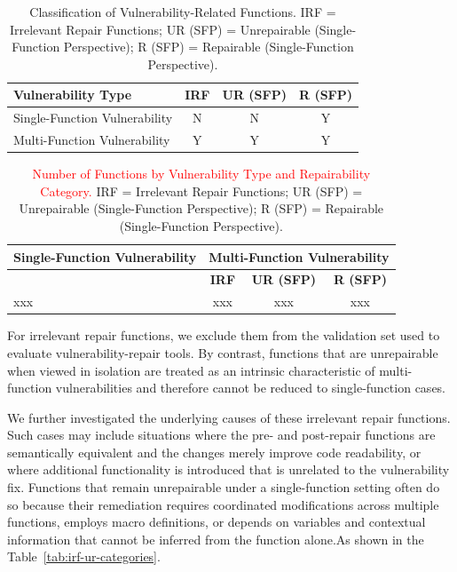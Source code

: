 \begin{table}[h]
\centering
\begin{tabular}{l|c|c|c}
\hline
\textbf{Vulnerability Type} & \textbf{IRF} & \textbf{UR (SFP)} & \textbf{R (SFP)} \\
\hline
Single-Function Vulnerability & N & N & Y \\
Multi-Function Vulnerability  & Y & Y & Y \\
\hline
\end{tabular}
\caption{Classification of Vulnerability-Related Functions. 
IRF = Irrelevant Repair Functions; UR (SFP) = Unrepairable (Single-Function Perspective); R (SFP) = Repairable (Single-Function Perspective).}
\label{tab:func-classification}
\end{table}


\begin{table}[h]
\centering
\begin{tabular}{>{\centering\arraybackslash}p{3cm}|c|c|c}
\hline
\textbf{Single-Function Vulnerability} & \multicolumn{3}{c}{\textbf{Multi-Function Vulnerability}} \\
\cline{2-4}
 & \textbf{IRF} & \textbf{UR (SFP)} & \textbf{R (SFP)} \\
\hline
xxx & xxx & xxx & xxx \\
\hline
\end{tabular}
\caption{\textcolor{red}{Number of Functions by Vulnerability Type and Repairability Category. }
IRF = Irrelevant Repair Functions; UR (SFP) = Unrepairable (Single-Function Perspective); R (SFP) = Repairable (Single-Function Perspective).}
\label{tab:func-classification-number}
\end{table}


For irrelevant repair functions, we exclude them from the validation set used to evaluate vulnerability-repair tools. By contrast, functions that are unrepairable when viewed in isolation are treated as an intrinsic characteristic of multi-function vulnerabilities and therefore cannot be reduced to single-function cases.

We further investigated the underlying causes of these irrelevant repair functions. Such cases may include situations where the pre- and post-repair functions are semantically equivalent and the changes merely improve code readability, or where additional functionality is introduced that is unrelated to the vulnerability fix. Functions that remain unrepairable under a single-function setting often do so because their remediation requires coordinated modifications across multiple functions, employs macro definitions, or depends on variables and contextual information that cannot be inferred from the function alone.As shown in the Table~\ref{tab:irf-ur-categories}.

